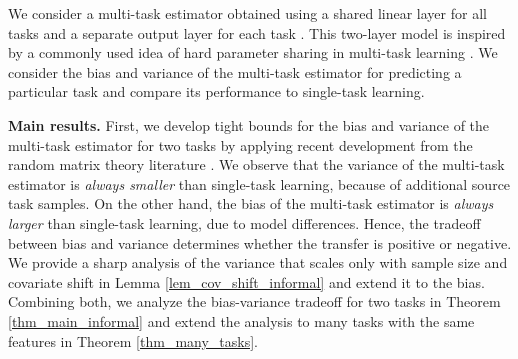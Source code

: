 We consider a multi-task estimator obtained using a shared linear layer for all tasks and a separate output layer for each task \cite{WZR20}.
This two-layer model is inspired by a commonly used idea of hard parameter sharing in multi-task learning \cite{R17,MTDNN19}.
We consider the bias and variance of the multi-task estimator for predicting a particular task and compare its performance to single-task learning.

\textbf{Main results.} First, we develop tight bounds for the bias and variance of the multi-task estimator for two tasks by applying recent development from the random matrix theory literature \cite{erdos2017dynamical,isotropic,Anisotropic}.
We observe that the variance of the multi-task estimator is \textit{always smaller} than single-task learning, because of additional source task samples.
On the other hand, the bias of the multi-task estimator is \textit{always larger} than single-task learning, due to model differences.
Hence, the tradeoff between bias and variance determines whether the transfer is positive or negative.
We provide a sharp analysis of the variance that scales only with sample size and covariate shift in Lemma \ref{lem_cov_shift_informal} and extend it to the bias.
Combining both, we analyze the bias-variance tradeoff for two tasks in Theorem \ref{thm_main_informal} and extend the analysis to many tasks with the same features in Theorem \ref{thm_many_tasks}.

